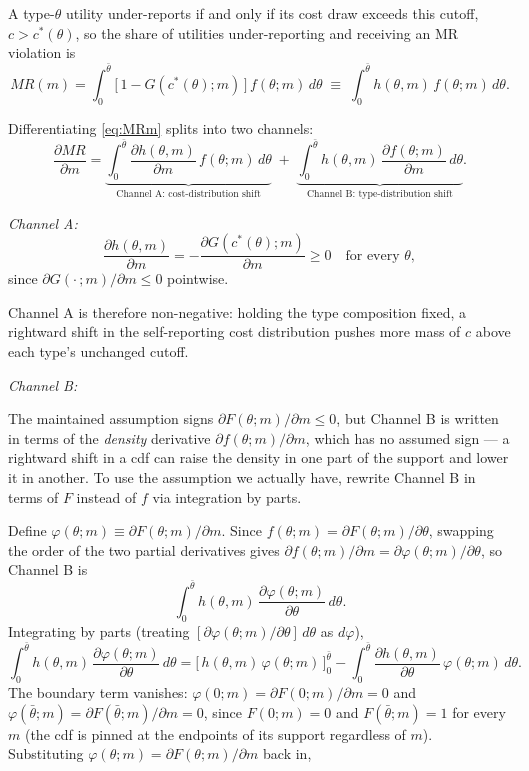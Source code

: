 \documentclass[12pt]{article}
\begin{document}
	A type-$\theta$ utility under-reports if and only if its cost draw exceeds this cutoff, $c > c^*(\theta)$, so the share of utilities under-reporting and receiving an MR violation is
	\begin{equation}\label{eq:MRm}
		MR(m) = \int_0^{\bar\theta} \big[\,1 - G(c^*(\theta);m)\,\big]\, f(\theta;m)\, d\theta \;\equiv\; \int_0^{\bar\theta} h(\theta,m)\, f(\theta;m)\, d\theta.
	\end{equation}
	
	Differentiating \eqref{eq:MRm} splits into two channels:
	\begin{equation}\label{eq:split}
		\frac{\partial MR}{\partial m} = \underbrace{\int_0^{\bar\theta} \frac{\partial h(\theta,m)}{\partial m}\, f(\theta;m)\, d\theta}_{\text{Channel A: cost-distribution shift}} \;+\; \underbrace{\int_0^{\bar\theta} h(\theta,m)\, \frac{\partial f(\theta;m)}{\partial m}\, d\theta}_{\text{Channel B: type-distribution shift}}.
	\end{equation}
	
	\textit{Channel A:}
	\[
	\frac{\partial h(\theta,m)}{\partial m} = -\frac{\partial G(c^*(\theta);m)}{\partial m} \ge 0 \quad \text{for every } \theta,
	\]
	since $\partial G(\cdot\,;m)/\partial m \le 0$ pointwise. 
    
    Channel A is therefore non-negative: holding the type composition fixed, a rightward shift in the self-reporting cost distribution pushes more mass of $c$ above each type's unchanged cutoff.

	\textit{Channel B:}

    The maintained assumption signs $\partial F(\theta;m)/\partial m \le 0$, but Channel B is written in terms of the \emph{density} derivative $\partial f(\theta;m)/\partial m$, which has no assumed sign — a rightward shift in a cdf can raise the density in one part of the support and lower it in another. To use the assumption we actually have, rewrite Channel B in terms of $F$ instead of $f$ via integration by parts.

	Define $\varphi(\theta;m) \equiv \partial F(\theta;m)/\partial m$. Since $f(\theta;m) = \partial F(\theta;m)/\partial\theta$, swapping the order of the two partial derivatives gives $\partial f(\theta;m)/\partial m = \partial \varphi(\theta;m)/\partial\theta$, so Channel B is
	\[
	\int_0^{\bar\theta} h(\theta,m)\,\frac{\partial \varphi(\theta;m)}{\partial\theta}\, d\theta.
	\]
	Integrating by parts (treating $[\partial \varphi(\theta;m)/\partial\theta]\,d\theta$ as $d\varphi$),
	\[
	\int_0^{\bar\theta} h(\theta,m)\,\frac{\partial \varphi(\theta;m)}{\partial\theta}\, d\theta = \Big[\,h(\theta,m)\,\varphi(\theta;m)\,\Big]_0^{\bar\theta} - \int_0^{\bar\theta} \frac{\partial h(\theta,m)}{\partial\theta}\,\varphi(\theta;m)\, d\theta.
	\]
	The boundary term vanishes: $\varphi(0;m) = \partial F(0;m)/\partial m = 0$ and $\varphi(\bar\theta;m) = \partial F(\bar\theta;m)/\partial m = 0$, since $F(0;m)=0$ and $F(\bar\theta;m)=1$ for every $m$ (the cdf is pinned at the endpoints of its support regardless of $m$). Substituting $\varphi(\theta;m) = \partial F(\theta;m)/\partial m$ back in,
\end{document}
